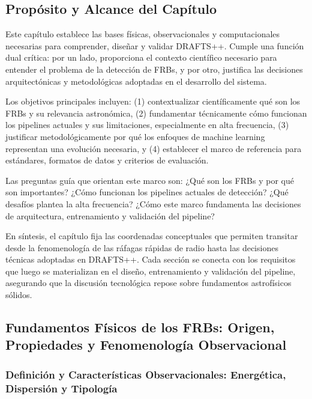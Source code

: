 
\subsection{Propósito y Alcance del Capítulo}

Este capítulo establece las bases físicas, observacionales y computacionales necesarias para comprender, diseñar y validar DRAFTS++. Cumple una función dual crítica: por un lado, proporciona el contexto científico necesario para entender el problema de la detección de FRBs, y por otro, justifica las decisiones arquitectónicas y metodológicas adoptadas en el desarrollo del sistema.

Los objetivos principales incluyen: (1) contextualizar científicamente qué son los FRBs y su relevancia astronómica, (2) fundamentar técnicamente cómo funcionan los pipelines actuales y sus limitaciones, especialmente en alta frecuencia, (3) justificar metodológicamente por qué los enfoques de machine learning representan una evolución necesaria, y (4) establecer el marco de referencia para estándares, formatos de datos y criterios de evaluación.

Las preguntas guía que orientan este marco son: ¿Qué son los FRBs y por qué son importantes? ¿Cómo funcionan los pipelines actuales de detección? ¿Qué desafíos plantea la alta frecuencia? ¿Cómo este marco fundamenta las decisiones de arquitectura, entrenamiento y validación del pipeline?

En síntesis, el capítulo fija las coordenadas conceptuales que permiten transitar desde la fenomenología de las ráfagas rápidas de radio hasta las decisiones técnicas adoptadas en DRAFTS++. Cada sección se conecta con los requisitos que luego se materializan en el diseño, entrenamiento y validación del pipeline, asegurando que la discusión tecnológica repose sobre fundamentos astrofísicos sólidos.

\subsection{Fundamentos Físicos de los FRBs: Origen, Propiedades y Fenomenología Observacional}

\subsubsection{Definición y Características Observacionales: Energética, Dispersión y Tipología}

